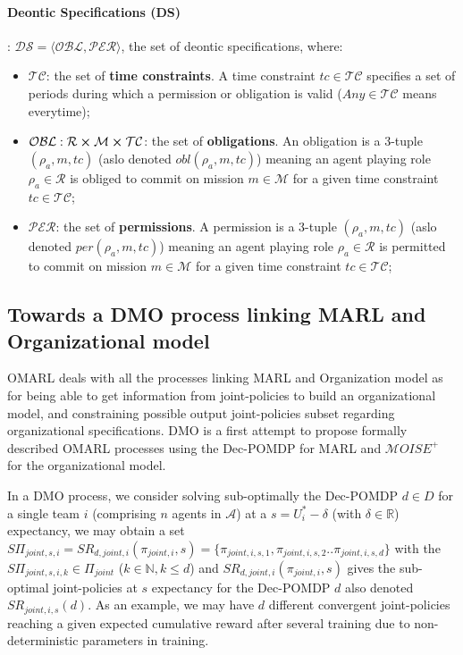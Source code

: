 \documentclass{ecai}
\begin{document}
\paragraph{\textbf{Deontic Specifications (DS)}}: $\mathcal{DS} = \langle \mathcal{OBL},\mathcal{PER} \rangle$, the set of deontic specifications, where:

\begin{itemize}
    \item $\mathcal{TC}$: the set of \textbf{time constraints}. A time constraint $tc \in \mathcal{TC}$ specifies a set of periods during which a permission or obligation is valid ($Any \in \mathcal{TC}$ means everytime);
    \item $\mathcal{OBL}: \mathcal{R} \cross \mathcal{M} \cross \mathcal{TC}$: the set of \textbf{obligations}. An obligation is a 3-tuple $(\rho_a,m,tc)$ (aslo denoted $obl(\rho_a,m,tc)$) meaning an agent playing role $\rho_a \in \mathcal{R}$ is obliged to commit on mission $m \in \mathcal{M}$ for a given time constraint $tc \in \mathcal{TC}$;
    \item $\mathcal{PER}$: the set of \textbf{permissions}. A permission is a 3-tuple $(\rho_a,m,tc)$ (aslo denoted $per(\rho_a,m,tc)$) meaning an agent playing role $\rho_a \in \mathcal{R}$ is permitted to commit on mission $m \in \mathcal{M}$ for a given time constraint $tc \in \mathcal{TC}$;
\end{itemize}

\subsection{Towards a DMO process linking MARL and Organizational model}

OMARL deals with all the processes linking MARL and Organization model as for being able to get information from joint-policies to build an organizational model, and constraining possible output joint-policies subset regarding organizational specifications. DMO is a first attempt to propose formally described OMARL processes using the Dec-POMDP for MARL and $\mathcal{M}OISE^+$ for the organizational model.

In a DMO process, we consider solving sub-optimally the Dec-POMDP $d \in D$ for a single team $i$ (comprising $n$ agents in $\mathcal{A}$) at a $s = U_i^* - \delta$ (with $\delta \in \mathbb{R}$) expectancy, we may obtain a set $S\Pi_{joint,s,i} = SR_{d,joint,i}(\pi_{joint,i},s) = \{\pi_{joint,i,s,1}, \pi_{joint,i,s,2} .. \pi_{joint,i,s,d}\}$ with the $S\Pi_{joint,s,i,k} \in \Pi_{joint}$ ($k \in \mathbb{N}, k \leq d$) and $SR_{d,joint,i}(\pi_{joint,i},s)$ gives the sub-optimal joint-policies at $s$ expectancy for the Dec-POMDP $d$ also denoted $SR_{joint,i,s}(d)$. As an example, we may have $d$ different convergent joint-policies reaching a given expected cumulative reward after several training due to non-deterministic parameters in training.
\end{document}
